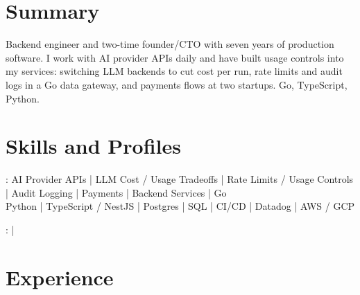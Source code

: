 \documentclass[print]{jack-resume}
\begin{document}
\pagecolor{darkmodeBackground}


\begin{minipage}[t][1cm][t]{.03\textwidth}
    \hfill
\end{minipage}

\section{Summary}
Backend engineer and two-time founder/CTO with seven years of production software. I work with AI provider APIs daily and have built usage controls into my services: switching LLM backends to cut cost per run, rate limits and audit logs in a Go data gateway, and payments flows at two startups. Go, TypeScript, Python.
\sectionsep

\section{Skills and Profiles}
:
AI Provider APIs \hfill | \hfill
LLM Cost / Usage Tradeoffs \hfill | \hfill
Rate Limits / Usage Controls \hfill | \hfill
Audit Logging \hfill | \hfill
Payments \hfill | \hfill
Backend Services \hfill | \hfill
Go \\
\hspace{1.0cm} Python \hfill | \hfill
TypeScript / NestJS \hfill | \hfill
Postgres \hfill | \hfill
SQL \hfill | \hfill
CI/CD \hfill | \hfill
Datadog \hfill | \hfill
AWS / GCP \\

\raggedright{
    :
      \href{https://www.linkedin.com/in/jack-sturtevant/}{ \ExternalLink} |
     \href{https://github.com/jacksturt}{ \ExternalLink}}

\section{Experience}
\end{document}
